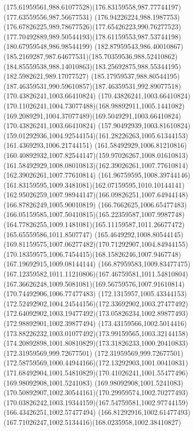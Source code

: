 {{\curveto(175.61959561,988.61077528)(176.83159558,987.77744197)(177.63559556,987.56677531)
\curveto(176.94226224,988.1987753)(176.67826225,989.78677526)(177.65426223,990.76277523)
\curveto(177.70492889,989.50544193)(178.61159553,987.53744198)(180.67959548,986.98544199)
\curveto(182.87959543,986.40010867)(185.2169287,987.64677531)(185.70359536,988.52410862)
\curveto(184.85559538,988.14010863)(183.25692875,988.55344195)(182.5982621,989.17077527)
\curveto(185.17959537,988.80544195)(187.46359531,990.59610857)(187.46359531,992.89077518)
\moveto(170.43826241,1003.66410824)
\curveto(170.43826241,1003.66410824)(170.11026241,1004.73077488)(168.98892911,1005.1441082)
\curveto(169.2089291,1004.37077489)(169.5049291,1003.66410824)(170.43826241,1003.66410824)
\moveto(157.90492939,1003.81610824)
\curveto(159.01292936,1004.92544154)(161.28226263,1005.61344153)(161.4369293,1006.21744151)
\curveto(161.58492929,1006.81210816)(160.40892932,1007.82544147)(159.97026267,1008.01610813)
\curveto(161.58492929,1008.08010813)(162.39026261,1007.77610814)(162.39026261,1007.77610814)
\curveto(161.96759595,1008.39744146)(161.83159595,1009.3481081)(162.07159595,1010.10144141)
\curveto(162.95026259,1007.98944147)(166.09826251,1007.64944148)(166.87826249,1005.90010819)
\curveto(166.7662625,1006.65477483)(166.05159585,1007.50410815)(165.22359587,1007.9987748)
\curveto(164.77826255,1009.1481081)(165.11159587,1011.26677472)(165.65559586,1011.8507747)
\curveto(165.4649292,1008.80544145)(169.81159575,1007.06277482)(170.71292907,1004.84944155)
\curveto(170.18359575,1006.7454415)(168.15826246,1007.9467748)(167.19692915,1009.08144144)
\curveto(166.87959583,1009.83477475)(167.12359582,1011.11210806)(167.46759581,1011.54810804)
\curveto(167.36626248,1009.5081081)(169.56759576,1007.91610814)(170.74492906,1006.77477483)
\curveto(172.1315957,1005.43344153)(172.52492902,1004.24544156)(172.33692902,1003.27477492)
\curveto(172.64092902,1003.19477492)(173.05826234,1002.89877493)(172.98892901,1002.39877494)
\curveto(173.43159566,1002.5014416)(173.88226232,1003.01077492)(173.99159565,1003.32144158)
\curveto(174.20892898,1001.80810829)(173.31826233,1000.20410833)(172.31959569,999.72677501)
\curveto(172.31959569,999.72677501)(172.58759569,1000.44944166)(172.13292903,1001.00410831)
\curveto(171.68492904,1001.54810829)(170.41026241,1001.55477496)(169.98092908,1001.5241083)
\curveto(169.98092908,1001.5241083)(170.50892907,1002.30544161)(170.29959574,1002.70277493)
\curveto(170.03826242,1003.19344159)(167.54759581,1002.97744159)(166.43426251,1002.57477494)
\curveto(166.81292916,1002.61477493)(167.71026247,1002.5134416)(168.0235958,1002.38410827)
}}
